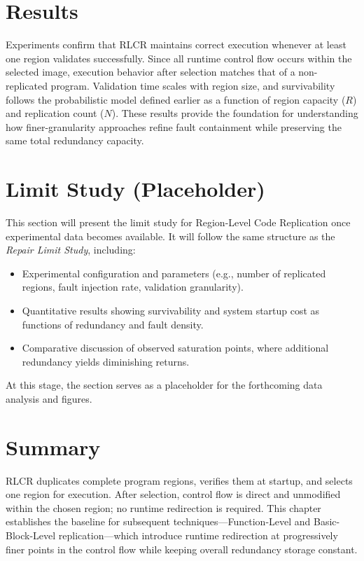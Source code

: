 \section{Results}
Experiments confirm that RLCR maintains correct execution whenever at least one region validates successfully.
Since all runtime control flow occurs within the selected image, execution behavior after selection matches that of a non-replicated program.
Validation time scales with region size, and survivability follows the probabilistic model defined earlier as a function of region capacity ($R$) and replication count ($N$).
These results provide the foundation for understanding how finer-granularity approaches refine fault containment while preserving the same total redundancy capacity.

\section{Limit Study (Placeholder)}
\label{sec:rlcr-limit-study}
This section will present the limit study for Region-Level Code Replication once experimental data becomes available.
It will follow the same structure as the \emph{Repair Limit Study}, including:
\begin{itemize}
  \item Experimental configuration and parameters (e.g., number of replicated regions, fault injection rate, validation granularity).
  \item Quantitative results showing survivability and system startup cost as functions of redundancy and fault density.
  \item Comparative discussion of observed saturation points, where additional redundancy yields diminishing returns.
\end{itemize}
At this stage, the section serves as a placeholder for the forthcoming data analysis and figures.

\section{Summary}
RLCR duplicates complete program regions, verifies them at startup, and selects one region for execution.
After selection, control flow is direct and unmodified within the chosen region; no runtime redirection is required.
This chapter establishes the baseline for subsequent techniques---Function-Level and Basic-Block-Level replication---which introduce runtime redirection at progressively finer points in the control flow while keeping overall redundancy storage constant.